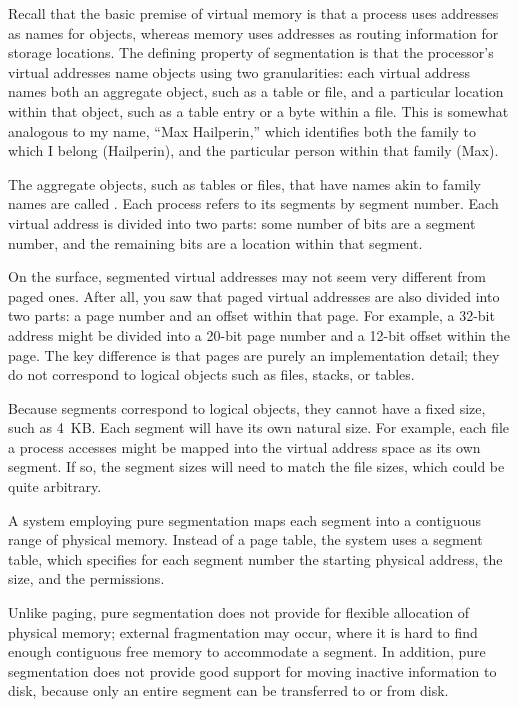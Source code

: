 Recall that the basic premise of virtual memory is that a process uses
addresses as names for objects, whereas memory uses addresses as
routing information for storage locations.  The defining property of
segmentation is that the processor's virtual addresses name
objects using two granularities: each virtual address names both
an aggregate object, such as a table or file, and a particular
location within that object, such as a table entry or a byte within a
file.  This is somewhat analogous to my name, ``Max Hailperin,''
which identifies both the family to which I belong (Hailperin), and
the particular person within that family (Max).

The aggregate objects, such as tables or files, that have names akin
to family names are called .  Each process refers to
its segments by segment number.  Each virtual address is divided into
two parts: some number of bits are a segment number, and the remaining
bits are a location within that segment.

On the surface, segmented virtual addresses may not seem very
different from paged ones.  After all, you saw that paged virtual
addresses are also divided into two parts: a page number and an offset
within that page.  For example, a 32-bit address might be divided into a
20-bit page number and a 12-bit offset within the page.  The key
difference is that pages are purely an implementation detail; they do
not correspond to logical objects such as files, stacks, or tables.

Because segments correspond to logical objects, they cannot have a
fixed size, such as 4~KB.  Each segment will have its own natural
size.  For example, each file a process accesses might be mapped into
the virtual address space as its own segment.  If so, the segment
sizes will need to match the file sizes, which could be quite
arbitrary.

A system employing pure segmentation maps each segment into a
contiguous range of physical memory.  Instead of a page table, the
system uses a segment table, which specifies for each segment number
the starting physical address, the size, and the permissions.

Unlike paging, pure segmentation does not provide for flexible
allocation of physical memory; external fragmentation may occur, where
it is hard to find enough contiguous free memory to accommodate a
segment.  In addition, pure segmentation does not provide good support for
moving inactive information to disk, because only an entire segment
can be transferred to or from disk.


